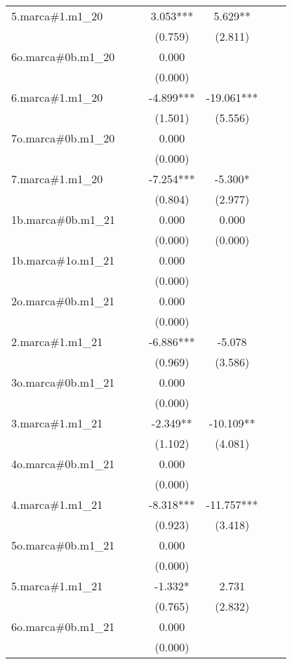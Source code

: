 \begin{tabular}{lcccccc}
5.marca\#1.m1\_20 &  &  & 3.053*** & 5.629** &  &  \\
 &  &  & (0.759) & (2.811) &  &  \\
6o.marca\#0b.m1\_20 &  &  & 0.000 &  &  &  \\
 &  &  & (0.000) &  &  &  \\
6.marca\#1.m1\_20 &  &  & -4.899*** & -19.061*** &  &  \\
 &  &  & (1.501) & (5.556) &  &  \\
7o.marca\#0b.m1\_20 &  &  & 0.000 &  &  &  \\
 &  &  & (0.000) &  &  &  \\
7.marca\#1.m1\_20 &  &  & -7.254*** & -5.300* &  &  \\
 &  &  & (0.804) & (2.977) &  &  \\
1b.marca\#0b.m1\_21 &  &  & 0.000 & 0.000 &  &  \\
 &  &  & (0.000) & (0.000) &  &  \\
1b.marca\#1o.m1\_21 &  &  & 0.000 &  &  &  \\
 &  &  & (0.000) &  &  &  \\
2o.marca\#0b.m1\_21 &  &  & 0.000 &  &  &  \\
 &  &  & (0.000) &  &  &  \\
2.marca\#1.m1\_21 &  &  & -6.886*** & -5.078 &  &  \\
 &  &  & (0.969) & (3.586) &  &  \\
3o.marca\#0b.m1\_21 &  &  & 0.000 &  &  &  \\
 &  &  & (0.000) &  &  &  \\
3.marca\#1.m1\_21 &  &  & -2.349** & -10.109** &  &  \\
 &  &  & (1.102) & (4.081) &  &  \\
4o.marca\#0b.m1\_21 &  &  & 0.000 &  &  &  \\
 &  &  & (0.000) &  &  &  \\
4.marca\#1.m1\_21 &  &  & -8.318*** & -11.757*** &  &  \\
 &  &  & (0.923) & (3.418) &  &  \\
5o.marca\#0b.m1\_21 &  &  & 0.000 &  &  &  \\
 &  &  & (0.000) &  &  &  \\
5.marca\#1.m1\_21 &  &  & -1.332* & 2.731 &  &  \\
 &  &  & (0.765) & (2.832) &  &  \\
6o.marca\#0b.m1\_21 &  &  & 0.000 &  &  &  \\
 &  &  & (0.000) &  &  &  \\

\end{tabular}
